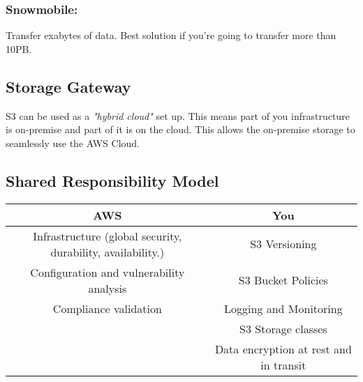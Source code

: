 \subsubsection{Snowmobile:} Transfer exabytes of data.
Best solution if you're going to transfer more than 10PB\@.

\subsection{Storage Gateway}\label{subsec:storage-gateway}
S3 can be used as a \textit{"hybrid cloud"} set up.
This means part of you infrastructure is on-premise and part of it is on the cloud.
This allows the on-premise storage to seamlessly use the AWS Cloud.

\pagebreak

\subsection{Shared Responsibility Model}\label{subsec:s3-shared-responsibility-model}
\begin{table}[h]
	\centering
	\begin{tabular}{||c c||}
		\hline
		\multicolumn{1}{||c|}{\textbf{AWS}}                                						& \textbf{You} \\ \hline
		\multicolumn{1}{||c|}{Infrastructure (global security, durability, availability.)}    	& S3 Versioning \\ \hline
		\multicolumn{1}{||c|}{Configuration and vulnerability analysis}    						& S3 Bucket Policies \\ \hline
		\multicolumn{1}{||c|}{Compliance validation}                    						& Logging and Monitoring \\ \hline
		\multicolumn{1}{||c|}{}												        			& S3 Storage classes \\ \hline
		\multicolumn{1}{||c|}{}       															& Data encryption at rest and in transit \\ \hline
	\end{tabular}
	\newline\newline
	\label{tab:shared-responsibility-model-table}
\end{table}

